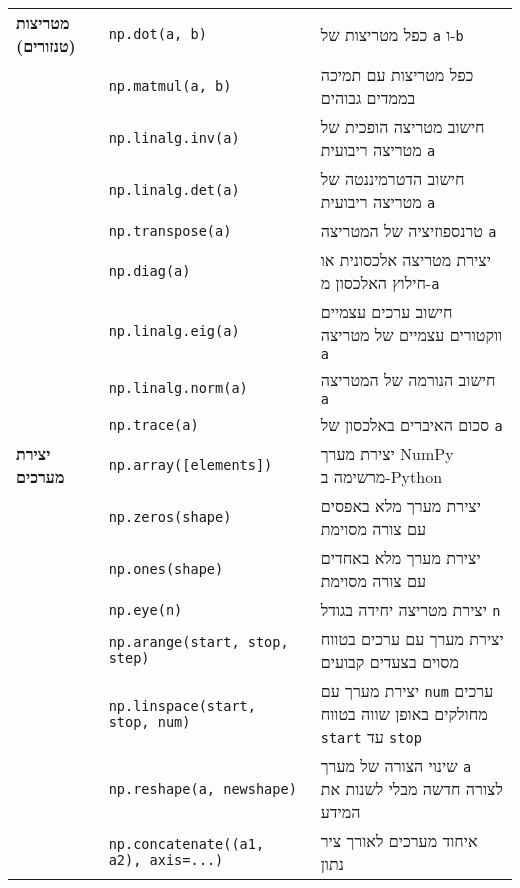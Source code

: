 \documentclass[a4paper, 12pt]{article}
\begin{document}
\begin{longtable}{|p{}|p{}|p{}|}
\textbf{מטריצות (טנזורים)} & \textenglish{\texttt{np.dot(a, b)}} & כפל מטריצות של \textenglish{\texttt{a}} ו-\textenglish{\texttt{b}} \\
                            & \textenglish{\texttt{np.matmul(a, b)}} & כפל מטריצות עם תמיכה בממדים גבוהים \\
                            & \textenglish{\texttt{np.linalg.inv(a)}} & חישוב מטריצה הופכית של מטריצה ריבועית \textenglish{\texttt{a}} \\
                            & \textenglish{\texttt{np.linalg.det(a)}} & חישוב הדטרמיננטה של מטריצה ריבועית \textenglish{\texttt{a}} \\
                            & \textenglish{\texttt{np.transpose(a)}} & טרנספוזיציה של המטריצה \textenglish{\texttt{a}} \\
                            & \textenglish{\texttt{np.diag(a)}} & יצירת מטריצה אלכסונית או חילוץ האלכסון מ-\textenglish{\texttt{a}} \\
                            & \textenglish{\texttt{np.linalg.eig(a)}} & חישוב ערכים עצמיים ווקטורים עצמיים של מטריצה \textenglish{\texttt{a}} \\
                            & \textenglish{\texttt{np.linalg.norm(a)}} & חישוב הנורמה של המטריצה \textenglish{\texttt{a}} \\
                            & \textenglish{\texttt{np.trace(a)}} & סכום האיברים באלכסון של \textenglish{\texttt{a}} \\

\hline

\textbf{יצירת מערכים} & \textenglish{\texttt{np.array([elements])}} & יצירת מערך \textenglish{NumPy} מרשימה ב-\textenglish{Python} \\
                      & \textenglish{\texttt{np.zeros(shape)}} & יצירת מערך מלא באפסים עם צורה מסוימת \\
                      & \textenglish{\texttt{np.ones(shape)}} & יצירת מערך מלא באחדים עם צורה מסוימת \\
                      & \textenglish{\texttt{np.eye(n)}} & יצירת מטריצה יחידה בגודל \textenglish{\texttt{n}} \\
                      & \textenglish{\texttt{np.arange(start, stop, step)}} & יצירת מערך עם ערכים בטווח מסוים בצעדים קבועים \\
                      & \textenglish{\texttt{np.linspace(start, stop, num)}} & יצירת מערך עם \textenglish{\texttt{num}} ערכים מחולקים באופן שווה בטווח \textenglish{\texttt{start}} עד \textenglish{\texttt{stop}} \\
                      & \textenglish{\texttt{np.reshape(a, newshape)}} & שינוי הצורה של מערך \textenglish{\texttt{a}} לצורה חדשה מבלי לשנות את המידע \\
                      & \textenglish{\texttt{np.concatenate((a1, a2), axis=...)}} & איחוד מערכים לאורך ציר נתון \\


\end{longtable}
\end{document}
